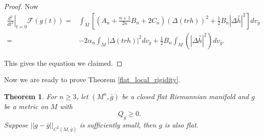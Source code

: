 \documentclass[12pt]{amsart}
\newtheorem{theorem}{Theorem}[section]
\theoremstyle{definition}
\theoremstyle{remark}
\numberwithin{equation}{section}
\begin{document}
\begin{proof}
Now
\begin{align*}
\left. \frac{d^2}{dt^2}\right|_{t=0} \mathscr{F}(g(t)) =& \int_M \left[(A_n + \frac{n+1}{2n}B_n + 2 C_n)( \Delta (tr h))^2 +\frac{1}{2}B_n |\Delta \overset{\circ}{h}|^2 \right] dv_{\bar{g}}\\
 =& -2 \alpha_n \int_M|\Delta(tr h)|^2 dv_{\bar{g}} + \frac{1}{2}B_n\int_M(|\Delta \overset{\circ}{h}|^2)dv_{\bar{g}}.
\end{align*}

This gives the equation we claimed.
\end{proof}

Now we are ready to prove Theorem \ref{flat_local_rigidity}.

\begin{theorem}
For $n \geq 3$, let $(M^n,\bar{g})$ be a closed flat Riemannian manifold and $g$ be a metric on $M$ with $$Q_g \geq 0.$$ Suppose $||g - \bar{g}||_{C^2(M, \bar{g})}$ is sufficiently small, then $g$ is also flat.
\end{theorem}
\end{document}
